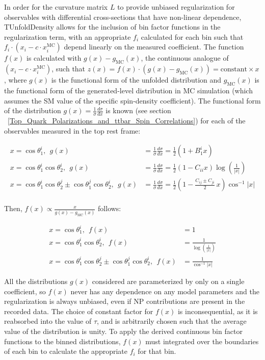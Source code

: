 In order for the curvature matrix $L$ to provide unbiased regularization for observables with differential cross-sections that have non-linear dependence, TUnfoldDensity allows for the inclusion of bin factor functions in the regularization term, with an appropriate $f_i$ calculated for each bin such that $f_i \cdot (x_i - c \cdot x^{\text{MC}}_i)$ depend linearly on the measured coefficient. 
The function $f(x)$ is calculated with $g(x) - g_{\text{MC}}(x)$, the continuous analogue of $(x_i - c \cdot x^{\text{MC}}_i)$, such that $z(x) = f(x) \cdot (g(x) - g_{\text{MC}}(x)) = \mathrm{constant} \times x$, where $g(x)$ is the functional form of the unfolded distribution and $g_{\text{MC}}(x)$ is the functional form of the generated-level distribution in MC simulation (which assumes the SM value of the specific spin-density coefficient).
The functional form of the distribution $g(x) = \tfrac{1}{\sigma}\tfrac{d\sigma}{dx}$ is known (see section ~\ref{Top_Quark_Polarizations_and_ttbar_Spin_Correlations}) for each of the observables measured in the top rest frame:
\begin{linenomath*}
\begin{align}
x=\cos\theta_1^i, \:\: g(x) &= \frac{1}{\sigma}\frac{d\sigma}{dx} = \frac{1}{2} (1+B_1^{i} x) \\ 
x=\cos\theta_1^i\cos\theta_2^i, \:\: g(x) &= \frac{1}{\sigma}\frac{d\sigma}{dx} = \frac{1}{2} (1-C_{ii} x) \log \left(\frac{1}{\left \vert x \right \vert }\right) \\ 
x=\cos\theta_1^i\cos\theta_2^j\pm \cos\theta_1^j\cos\theta_2^i, \:\: g(x) &= \frac{1}{\sigma}\frac{d\sigma}{dx} = \frac{1}{2} \left( 1 - \frac{C_{ij} \pm C_{ji}}{2} \, x \right)  \cos ^{-1}\left \vert x \right \vert \\
\end{align}
\end{linenomath*}
Then, $f(x) \propto \frac{x}{g(x)-g_{\text{MC}}(x)}$ follows:
\begin{linenomath*}
\begin{align}
x=\cos\theta_1^i, \:\: f(x) &= 1 \\
x=\cos\theta_1^i\cos\theta_2^i, \:\: f(x) &= \frac{1}{\log \left(\frac{1}{\left\vert x \right \vert }\right)} \\
x=\cos\theta_1^i\cos\theta_2^j\pm \cos\theta_1^j\cos\theta_2^i, \:\: f(x) &=  \frac{1}{\cos ^{-1}\left \vert x \right \vert}
\end{align}
\end{linenomath*}
All the distributions $g(x)$ considered are parameterized by only on a single coefficient, so $f(x)$ never has any dependence on any model parameters and the regularization is always unbiased, even if NP contributions are present in the recorded data. 
The choice of constant factor for $f(x)$ is inconsequential, as it is reabsorbed into the value of $\tau$, and is arbitrarily chosen such that the average value of the distribution is unity.
To apply the derived continuous bin factor functions to the binned distributions, $f(x)$ must integrated over the boundaries of each bin to calculate the appropriate $f_i$ for that bin. 

